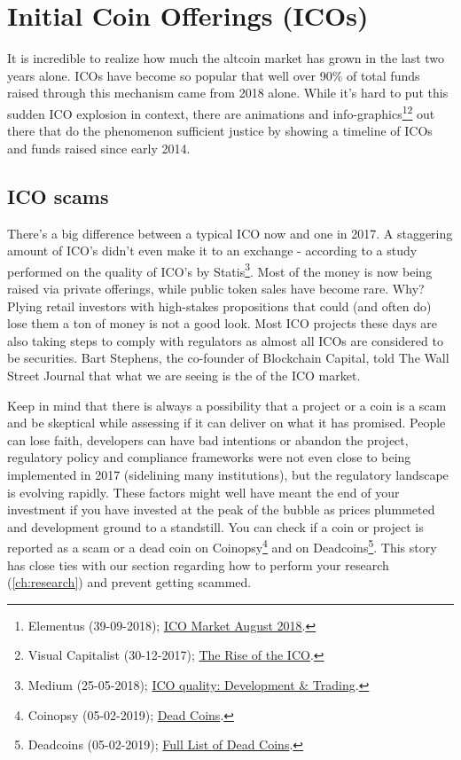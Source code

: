 \section{Initial Coin Offerings (ICOs)}
It is incredible to realize how much the altcoin market has grown in the last two years alone. ICOs have become so popular that well over 90\% of total funds raised through this mechanism came from 2018 alone. While it's hard to put this sudden ICO explosion in context, there are animations and info-graphics\footnote{Elementus (39-09-2018); \href{https://elementus.io/blog/ico-market-august-2018}{ICO Market August 2018}.}\footnote{Visual Capitalist (30-12-2017); \href{https://www.visualcapitalist.com/the-rise-of-the-ico}{The Rise of the ICO}.} out there that do the phenomenon sufficient justice by showing a timeline of ICOs and funds raised since early 2014. 

\subsection{ICO scams}

There's a big difference between a typical ICO now and one in 2017. A staggering amount of ICO's didn't even make it to an exchange - according to a study performed on the quality of ICO's by Statis\footnote{Medium (25-05-2018); \href{https://medium.com/satis-group/ico-quality-development-trading-e4fef28df04f}{ICO quality: Development \& Trading}.}. Most of the money is now being raised via private offerings, while public token sales have become rare. Why? Plying retail investors with high-stakes propositions that could (and often do) lose them a ton of money is not a good look. Most ICO projects these days are also taking steps to comply with regulators as almost all ICOs are considered to be securities. Bart Stephens, the co-founder of Blockchain Capital, told The Wall Street Journal that what we are seeing is the  of the ICO market.

Keep in mind that there is always a possibility that a project or a coin is a scam and be skeptical while assessing if it can deliver on what it has promised. People can lose faith, developers can have bad intentions or abandon the project, regulatory policy and compliance frameworks were not even close to being implemented in 2017 (sidelining many institutions), but the regulatory landscape is evolving rapidly. These factors might well have meant the end of your investment if you have invested at the peak of the bubble as prices plummeted and development ground to a standstill. You can check if a coin or project is reported as a scam or a dead coin on Coinopsy\footnote{Coinopsy (05-02-2019);
\href{https://www.coinopsy.com/dead-coins}{Dead Coins}.} and on Deadcoins\footnote{Deadcoins (05-02-2019); \href{https://deadcoins.com}{Full List of Dead Coins}.}. This story has close ties with our section regarding how to perform your research (\cref{ch:research}) and prevent getting scammed. 

